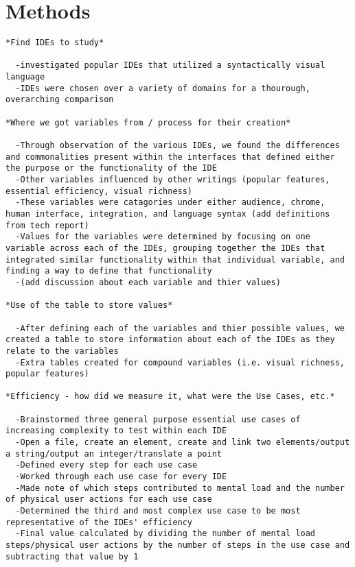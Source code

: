 \section{Methods}
\label{sec:methods}

\begin{verbatim}
*Find IDEs to study*

  -investigated popular IDEs that utilized a syntactically visual language
  -IDEs were chosen over a variety of domains for a thourough, overarching comparison

*Where we got variables from / process for their creation*

  -Through observation of the various IDEs, we found the differences and commonalities present within the interfaces that defined either the purpose or the functionality of the IDE
  -Other variables influenced by other writings (popular features, essential efficiency, visual richness)
  -These variables were catagories under either audience, chrome, human interface, integration, and language syntax (add definitions from tech report)
  -Values for the variables were determined by focusing on one variable across each of the IDEs, grouping together the IDEs that integrated similar functionality within that individual variable, and finding a way to define that functionality
  -(add discussion about each variable and thier values)

*Use of the table to store values*

  -After defining each of the variables and thier possible values, we created a table to store information about each of the IDEs as they relate to the variables
  -Extra tables created for compound variables (i.e. visual richness, popular features)

*Efficiency - how did we measure it, what were the Use Cases, etc.*

  -Brainstormed three general purpose essential use cases of increasing complexity to test within each IDE
  -Open a file, create an element, create and link two elements/output a string/output an integer/translate a point
  -Defined every step for each use case
  -Worked through each use case for every IDE
  -Made note of which steps contributed to mental load and the number of physical user actions for each use case
  -Determined the third and most complex use case to be most representative of the IDEs' efficiency
  -Final value calculated by dividing the number of mental load steps/physical user actions by the number of steps in the use case and subtracting that value by 1


\end{verbatim}
